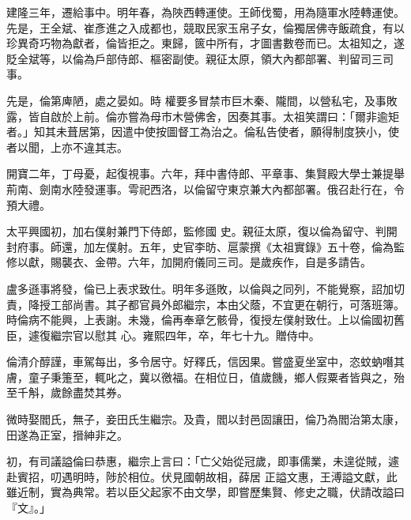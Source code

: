 \begin{pinyinscope}
 建隆三年，遷給事中。明年春，為陜西轉運使。王師伐蜀，用為隨軍水陸轉運使。先是，王全斌、崔彥進之入成都也，競取民家玉帛子女，倫獨居佛寺飯疏食，有以珍異奇巧物為獻者，倫皆拒之。東歸，篋中所有，才圖書數卷而已。太祖知之，遂貶全斌等，以倫為戶部侍郎、樞密副使。親征太原，領大內都部署、判留司三司事。



 先是，倫第庳陋，處之晏如。時
 權要多冒禁市巨木秦、隴間，以營私宅，及事敗露，皆自啟於上前。倫亦嘗為母市木營佛舍，因奏其事。太祖笑謂曰：「爾非逾矩者。」知其未葺居第，因遣中使按圖督工為治之。倫私告使者，願得制度狹小，使者以聞，上亦不違其志。



 開寶二年，丁母憂，起復視事。六年，拜中書侍郎、平章事、集賢殿大學士兼提舉荊南、劍南水陸發運事。雩祀西洛，以倫留守東京兼大內都部署。俄召赴行在，令預大禮。



 太平興國初，加右僕射兼門下侍郎，監修國
 史。親征太原，復以倫為留守、判開封府事。師還，加左僕射。五年，史官李昉、扈蒙撰《太祖實錄》五十卷，倫為監修以獻，賜襲衣、金帶。六年，加開府儀同三司。是歲疾作，自是多請告。



 盧多遜事將發，倫已上表求致仕。明年多遜敗，以倫與之同列，不能覺察，詔加切責，降授工部尚書。其子都官員外郎繼宗，本由父蔭，不宜更在朝行，可落班簿。時倫病不能興，上表謝。未幾，倫再奉章乞骸骨，復授左僕射致仕。上以倫國初舊臣，遽復繼宗官以慰其
 心。雍熙四年，卒，年七十九。贈侍中。



 倫清介醇謹，車駕每出，多令居守。好釋氏，信因果。嘗盛夏坐室中，恣蚊蚋噆其膚，童子秉箑至，輒叱之，冀以徼福。在相位日，值歲饑，鄉人假粟者皆與之，殆至千斛，歲餘盡焚其券。



 微時娶閻氏，無子，妾田氏生繼宗。及貴，閻以封邑固讓田，倫乃為閻治第太康，田遂為正室，搢紳非之。



 初，有司議謚倫曰恭惠，繼宗上言曰：「亡父始從冠歲，即事儒業，未遑從賊，遽赴賓招，叨遇明時，陟於相位。伏見國朝故相，薛居
 正謚文惠，王溥謚文獻，此雖近制，實為典常。若以臣父起家不由文學，即嘗歷集賢、修史之職，伏請改謚曰『文』。」




\end{pinyinscope}
